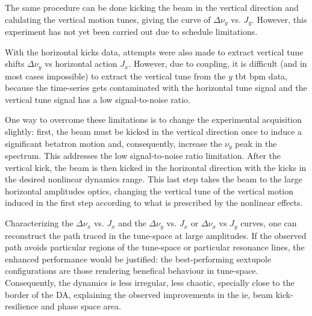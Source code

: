 The same procedure can be done kicking the beam in the vertical direction and calulating the vertical motion tunes, giving the curve of $\Delta \nu_y$ vs. $J_y$. However, this experiment has not yet been carried out due to schedule limitations.

With the horizontal kicks data, attempts were also made to extract vertical tune shifts $\Delta \nu_y$ vs horizontal action $J_x$. However, due to coupling, it is difficult (and in most cases impossible) to extract the vertical tune from the $y$ \gls*{tbt} \gls*{bpm} data, because the time-series gets contaminated with the horizontal tune signal and the vertical tune signal has a low signal-to-noise ratio. 

One way to overcome these limitations is to change the experimental acquisition slightly: first, the beam must be kicked in the vertical direction  once to induce a significant betatron motion and, consequently, increase the $\nu_y$ peak in the spectrum. This addresses the low signal-to-noise ratio limitation. After the vertical kick, the beam is then kicked in the horizontal direction with the kicks in the desired nonlinear dynamics range. This last step takes the beam to the large horizontal amplitudes optics, changing the vertical tune of the vertical motion induced in the first step according to what is prescribed by the nonlinear effects.

Characterizing the $\Delta \nu_x$ vs. $J_x$ and the $\Delta \nu_y$ vs. $J_x$ or $\Delta \nu_x$ vs $J_y$ curves, one can reconstruct the path traced in the tune-space at large amplitudes. If the observed path avoids particular regions of the tune-space or particular resonance lines, the enhanced performance would be justified: the best-performing sextupole configurations are those rendering benefical behaviour in tune-space. Consequently, the dynamics is less irregular, less chaotic, specially close to the border of the \gls*{DA}, explaining the observed improvements in the \gls*{ie}, beam kick-resilience and phase space area.

